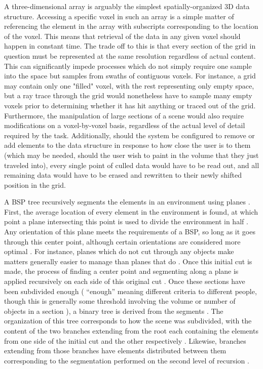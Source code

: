 \documentclass[onecolumn, draftclsnofoot,10pt, compsoc]{IEEEtran}
\newcounter{threesection}[subsubsection]
\begin{document}

A three-dimensional array is arguably the simplest spatially-organized 3D data structure.
Accessing a specific voxel in such an array is a simple matter of referencing the element in the array with subscripts corresponding to the location of the voxel.
This means that retrieval of the data in any given voxel should happen in constant time.
The trade off to this is that every section of the grid in question must be represented at the same resolution regardless of actual content.
This can significantly impede processes which do not simply require one sample into the space but samples from swaths of contiguous voxels.
For instance, a grid may contain only one "filled" voxel, with the rest representing only empty space, but a ray trace through the grid would nonetheless have to sample many empty voxels prior to determining whether it has hit anything or traced out of the grid.
Furthermore, the manipulation of large sections of a scene would also require modifications on a voxel-by-voxel basis, regardless of the actual level of detail required by the task.
Additionally, should the system be configured to remove or add elements to the data structure in response to how close the user is to them (which may be needed, should the user wish to paint in the volume that they just traveled into), every single point of culled data would have to be read out, and all remaining data would have to be erased and rewritten to their newly shifted position in the grid. 




A BSP tree recursively segments the elements in an environment using planes \cite{5}. 
First, the average location of every element in the environment is found, at which point a plane intersecting this point is used to divide the environment in half \cite{5}.
Any orientation of this plane meets the requirements of a BSP, so long as it goes through this center point, although certain orientations are considered more optimal \cite{5}.
For instance, planes which do not cut through any objects make matters generally easier to manage than planes that do \cite{5}.
Once this initial cut is made, the process of finding a center point and segmenting along a plane is applied recursively on each side of this original cut \cite{5}.
Once these sections have been subdivided enough ( “enough” meaning different criteria to different people, though this is generally some threshold involving the volume or number of objects in a section ), a binary tree is derived from the segments \cite{5}.
The organization of this tree corresponds to how the scene was subdivided, with the content of the two branches extending from the root each containing the elements from one side of the initial cut and the other respectively \cite{5}.
Likewise, branches extending from those branches have elements distributed between them corresponding to the segmentation performed on the second level of recursion \cite{5}.
\end{document}
